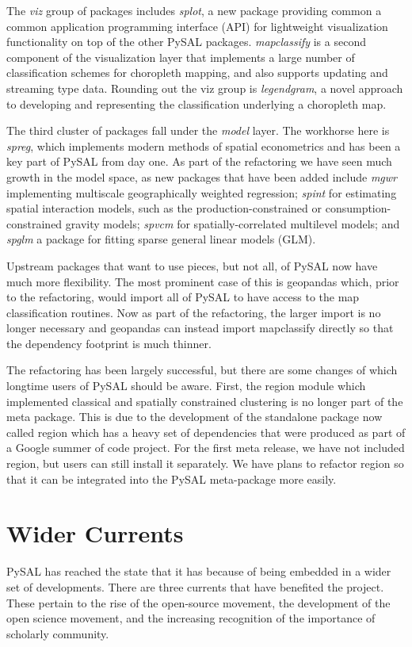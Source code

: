 \documentclass[11pt]{article}
\begin{document}
The \emph{viz} group of packages includes \emph{splot}, a new package providing common a
common application programming interface (API) for lightweight visualization
functionality on top of the other PySAL packages. \emph{mapclassify} is a second
component of the visualization layer that implements a large number of
classification schemes for choropleth mapping, and also supports updating and
streaming type data. Rounding out the viz group is \emph{legendgram}, a novel approach
to developing and representing the classification underlying a choropleth
map.

The third cluster of packages fall under the \emph{model} layer. The workhorse here
is \emph{spreg}, which implements modern methods of spatial econometrics and has been a
key part of PySAL from day one. As part of the refactoring we have seen much
growth in the model space, as new packages that have been added include \emph{mgwr}
implementing multiscale geographically weighted regression; \emph{spint} for
estimating spatial interaction models, such as the production-constrained or
consumption-constrained gravity models;  \emph{spvcm} for spatially-correlated
multilevel models; and \emph{spglm} a package for fitting sparse general linear models
(GLM).


Upstream packages that want to use pieces, but not all, of PySAL now have much
more flexibility. The most prominent case of this is geopandas
which, prior to the refactoring, would import all of PySAL to have access to
the map classification routines. Now as part of the refactoring, the larger
import is no longer necessary and geopandas can instead import mapclassify
directly so that the dependency footprint is much thinner.




The refactoring has been largely successful, but there are some changes of which
longtime users of PySAL should be aware. First, the region module which
implemented classical and spatially constrained clustering is no longer part of
the meta package. This is due to the development of the standalone package now
called region which has a heavy set of dependencies that were produced as part
of a Google summer of code project. For the first meta release, we have not
included region, but users can still install it separately. We have plans to
refactor region so that it can be integrated into the PySAL meta-package more
easily.

\section*{Wider Currents}
\label{sec:orgf89c39f}
PySAL has reached the state that it has because of being embedded in a wider set
of developments. There are three currents that have benefited the project. These
pertain to the rise of the open-source movement, the development of the open
science movement, and the increasing recognition of the importance of scholarly
community.
\end{document}
